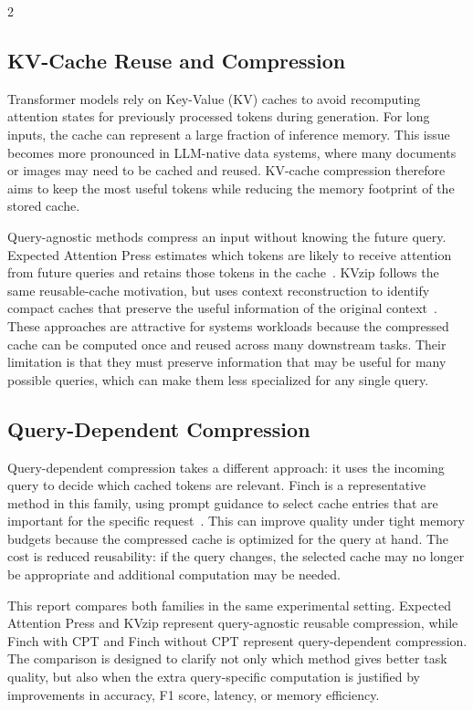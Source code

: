 \documentclass[10pt,a4paper]{article}
\begin{document}
\begin{multicols}{2}
\subsection{KV-Cache Reuse and Compression}

Transformer models rely on Key-Value (KV) caches to avoid recomputing attention
states for previously processed tokens during generation. For long inputs, the
cache can represent a large fraction of inference memory. This issue becomes
more pronounced in LLM-native data systems, where many documents or images may
need to be cached and reused. KV-cache compression therefore aims to keep the
most useful tokens while reducing the memory footprint of the stored cache.

Query-agnostic methods compress an input without knowing the future query.
Expected Attention Press estimates which tokens are likely to receive attention
from future queries and retains those tokens in the cache~\cite{expected-attention}.
KVzip follows the same reusable-cache motivation, but uses context
reconstruction to identify compact caches that preserve the useful information
of the original context~\cite{kvzip}. These approaches are attractive for
systems workloads because the compressed cache can be computed once and reused
across many downstream tasks. Their limitation is that they must preserve
information that may be useful for many possible queries, which can make them
less specialized for any single query.

\subsection{Query-Dependent Compression}

Query-dependent compression takes a different approach: it uses the incoming
query to decide which cached tokens are relevant. Finch is a representative
method in this family, using prompt guidance to select cache entries that are
important for the specific request~\cite{finch}. This can improve quality under
tight memory budgets because the compressed cache is optimized for the query at
hand. The cost is reduced reusability: if the query changes, the selected cache
may no longer be appropriate and additional computation may be needed.

This report compares both families in the same experimental setting. Expected
Attention Press and KVzip represent query-agnostic reusable compression, while
Finch with CPT and Finch without CPT represent query-dependent compression. The
comparison is designed to clarify not only which method gives better task
quality, but also when the extra query-specific computation is justified by
improvements in accuracy, F1 score, latency, or memory efficiency.


\end{multicols}
\end{document}
